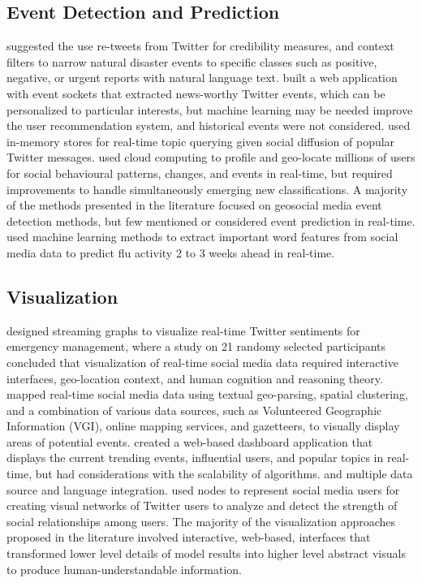 \subsection{Event Detection and Prediction} \label{event-detection}

\cite{Middleton:2014} suggested the use re-tweets from Twitter for credibility measures, and context filters to narrow natural disaster events to specific classes such as positive, negative, or urgent reports with natural language text. \cite{Hazra:2015} built a web application with event sockets that extracted news-worthy Twitter events, which can be personalized to particular interests, but machine learning may be needed improve the user recommendation system, and historical events were not considered. \cite{Enoki:2015} used in-memory stores for real-time topic querying given social diffusion of popular Twitter messages. \cite{Abrol:2015} used cloud computing to profile and geo-locate millions of users for social behavioural patterns,  changes, and events in real-time, but required improvements to handle simultaneously emerging new classifications. A majority of the methods presented in the literature focused on geosocial media event detection methods, but few mentioned or considered event prediction in real-time. \cite{Lee:2017} used machine learning methods to extract important word features from social media data to predict flu activity 2 to 3 weeks ahead in real-time.

\subsection{Visualization} \label{visualization}

\cite{Calderon:2014} designed streaming graphs to visualize real-time Twitter sentiments for emergency management, where a study on 21 randomy selected participants concluded that visualization of real-time social media data required interactive interfaces, geo-location context, and human cognition and reasoning theory. \cite{Middleton:2014} mapped real-time social media data using textual geo-parsing, spatial clustering, and a combination of various data sources, such as Volunteered Geographic Information (VGI), online mapping services, and gazetteers, to visually display areas of potential events.  \cite{Tsirakis:2015} created a web-based dashboard application that displays the current trending events, influential users, and popular topics in real-time, but had considerations with the scalability of algorithms. and multiple data source and language integration.  \cite{Kumar:2016} used nodes to represent social media users for creating visual networks of Twitter users to analyze and detect the strength of social relationships among users. The majority of the visualization approaches proposed in the literature involved interactive, web-based, interfaces that transformed lower level details of model results into higher level abstract visuals to produce human-understandable information.

